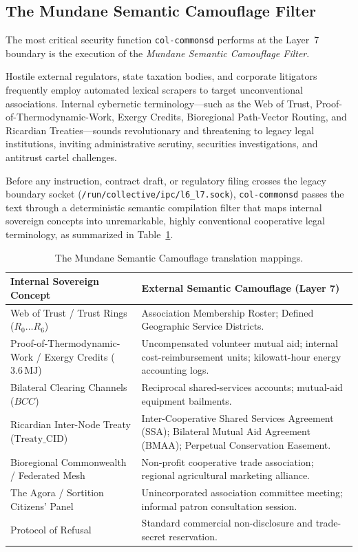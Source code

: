 \subsection{The Mundane Semantic Camouflage Filter}

The most critical security function \texttt{col-commonsd} performs at the Layer~7 boundary is the execution of the \textit{Mundane Semantic Camouflage Filter}. 

Hostile external regulators, state taxation bodies, and corporate litigators frequently employ automated lexical scrapers to target unconventional associations. Internal cybernetic terminology---such as the Web of Trust, Proof-of-Thermodynamic-Work, Exergy Credits, Bioregional Path-Vector Routing, and Ricardian Treaties---sounds revolutionary and threatening to legacy legal institutions, inviting administrative scrutiny, securities investigations, and antitrust cartel challenges.

Before any instruction, contract draft, or regulatory filing crosses the legacy boundary socket (\texttt{/run/\allowbreak collective/\allowbreak ipc/\allowbreak l6\_l7.sock}), \texttt{col-commonsd} passes the text through a deterministic semantic compilation filter that maps internal sovereign concepts into unremarkable, highly conventional cooperative legal terminology, as summarized in Table~\ref{tab:l6-camouflage}.

\begin{table}[htbp]
\centering
\small
\begin{tabular}{|p{}|p{}|}
\hline
\textbf{Internal Sovereign Concept} & \textbf{External Semantic Camouflage (Layer 7)} \\
\hline
Web of Trust / Trust Rings ($R_0 \dots R_6$) & Association Membership Roster; Defined Geographic Service Districts. \\
\hline
Proof-of-Thermodynamic-Work / Exergy Credits ($3.6\,\mathrm{MJ}$) & Uncompensated volunteer mutual aid; internal cost-reimbursement units; kilowatt-hour energy accounting logs. \\
\hline
Bilateral Clearing Channels ($BCC$) & Reciprocal shared-services accounts; mutual-aid equipment bailments. \\
\hline
Ricardian Inter-Node Treaty ($\mathrm{Treaty\_CID}$) & Inter-Cooperative Shared Services Agreement (SSA); Bilateral Mutual Aid Agreement (BMAA); Perpetual Conservation Easement. \\
\hline
Bioregional Commonwealth / Federated Mesh & Non-profit cooperative trade association; regional agricultural marketing alliance. \\
\hline
The Agora / Sortition Citizens' Panel & Unincorporated association committee meeting; informal patron consultation session. \\
\hline
Protocol of Refusal & Standard commercial non-disclosure and trade-secret reservation. \\
\hline
\end{tabular}
\caption{The Mundane Semantic Camouflage translation mappings.}
\label{tab:l6-camouflage}
\end{table}

